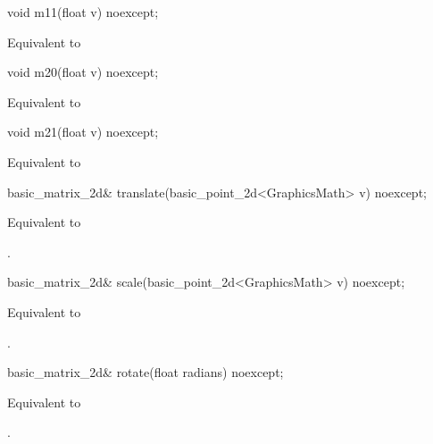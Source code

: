 %
\begin{itemdecl}
void m11(float v) noexcept;
\end{itemdecl}
\begin{itemdescr}
\pnum
\effects
Equivalent to 
\end{itemdescr}

%
\begin{itemdecl}
void m20(float v) noexcept;
\end{itemdecl}
\begin{itemdescr}
\pnum
\effects
Equivalent to 
\end{itemdescr}

%
\begin{itemdecl}
void m21(float v) noexcept;
\end{itemdecl}
\begin{itemdescr}
\pnum
\effects
Equivalent to 
\end{itemdescr}

%
\begin{itemdecl}
basic_matrix_2d& translate(basic_point_2d<GraphicsMath> v) noexcept;
\end{itemdecl}
\begin{itemdescr}
\pnum
\effects
Equivalent to 

\pnum
\returns
{}.
\end{itemdescr}

%
\begin{itemdecl}
basic_matrix_2d& scale(basic_point_2d<GraphicsMath> v) noexcept;
\end{itemdecl}
\begin{itemdescr}
\pnum
\effects
Equivalent to 

\pnum
\returns
{}.
\end{itemdescr}

%
\begin{itemdecl}
basic_matrix_2d& rotate(float radians) noexcept;
\end{itemdecl}
\begin{itemdescr}
\pnum
\effects
Equivalent to 

\pnum
\returns
{}.
\end{itemdescr}

